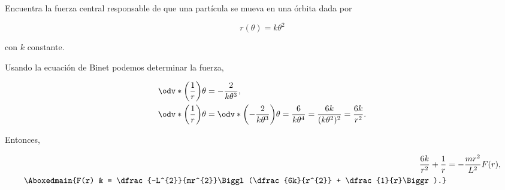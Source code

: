 \documentclass[../main.tex]{subfiles}
\begin{document}
\begin{problema}
	Encuentra la fuerza central responsable de que una partícula se
	mueva en una órbita dada por

	\begin{equation}
		r(\theta) = k\theta^{2}
	\end{equation}

	con \(k\) constante.
\end{problema}

\startsolution

Usando la ecuación de Binet podemos determinar la fuerza,

\begin{align*}
	\odv*{\biggl(\dfrac{1}{r}\biggr)}{\theta} & = -\dfrac{2}{k\theta^{3}},                                                                                                           \\
	\odv*{\biggl(\dfrac{1}{r}\biggr)}{\theta} & = \odv*{\biggl(-\dfrac{2}{k\theta^{3}}\biggr)}{\theta} = \dfrac{6}{k\theta^{4}} = \dfrac{6k}{(k\theta^{2})^{2}} = \dfrac{6k}{r^{2}}.
\end{align*}

Entonces,

\begin{align*}
	\dfrac{6k}{r^{2}} + \dfrac{1}{r} & = -\dfrac{mr^{2}}{L^{2}}F(r),                                            \\
	\Aboxedmain{F(r)                 & = \dfrac{-L^{2}}{mr^{2}}\Biggl(\dfrac{6k}{r^{2}} + \dfrac{1}{r}\Biggr).}
\end{align*}
\end{document}
